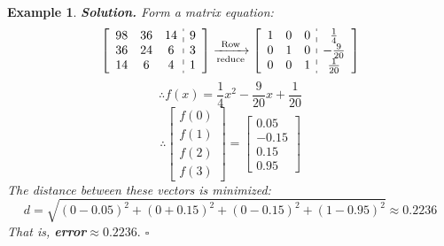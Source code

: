 \documentclass[12pt, a4paper]{article}
\newtheorem{eg}{Example}[subsection]
\newenvironment*{sol}{\par\indent\textbf{\textit{Solution. }}}{\hfill{$\square$}\par}
\begin{document}
\begin{eg}
\begin{sol}
		Form a matrix equation: 
		\[\left[\begin{array}{c:c}\begin{matrix}98&36&14\\36&24&6\\14&6&4\end{matrix}&\begin{matrix}9\\3\\1\end{matrix}\end{array}\right]\xrightarrow[\text{reduce}]{\text{Row}}\left[\begin{array}{c:c}\begin{matrix}1&0&0\\0&1&0\\0&0&1\end{matrix}&\begin{matrix}\frac{1}{4}\\-\frac{9}{20}\\\frac{1}{20}\end{matrix}\end{array}\right]\]
		\[\therefore f(x)=\frac{1}{4}x^2-\frac{9}{20}x+\frac{1}{20}\]
		\[\therefore \begin{bmatrix}f(0)\\f(1)\\f(2)\\f(3)\end{bmatrix}=\begin{bmatrix}0.05\\-0.15\\0.15\\0.95\end{bmatrix}\]
		The distance between these vectors is minimized: 
		\[d=\sqrt{(0-0.05)^2+(0+0.15)^2+(0-0.15)^2+(1-0.95)^2}\approx0.2236\]
		That is, \textbf{error}$\approx0.2236.$
	\end{sol}
\end{eg}
\end{document}
